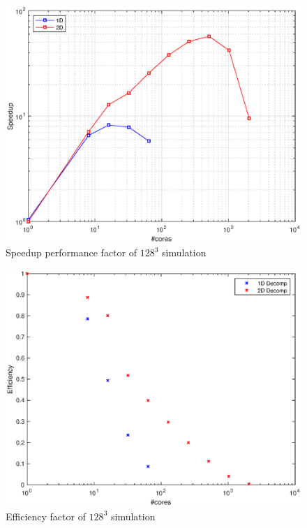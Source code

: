 \begin{figure}
\begin{center}
\includegraphics[scale=0.6]{grafici/642}
\caption{Speedup performance factor of $128^3$ simulation}
\label{642}
\end{center}
\end{figure}

\begin{figure}
\begin{center}
\includegraphics[scale=0.6]{grafici/644}
\caption{Efficiency factor of $128^3$ simulation}
\label{644}
\end{center}
\end{figure}

